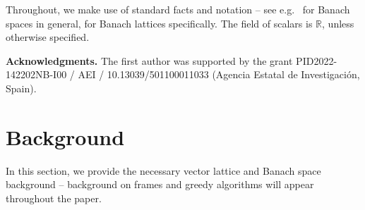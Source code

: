 \documentclass[12pt,leqno]{amsart}
\numberwithin{equation}{section}
\theoremstyle{definition}
\def\R{{\mathbb R}}
\begin{document}
Throughout, we make use of standard facts and notation -- see e.g.~\cite{AK16, LT1, LT2} for Banach spaces in general, \cite{MN} for Banach lattices specifically. The field of scalars is $\R$, unless otherwise specified.
\medskip

\textbf{Acknowledgments.} The first author was supported by the grant PID2022-142202NB-I00 / AEI / 10.13039/501100011033 (Agencia Estatal de Investigaci\'on, Spain).





\section{Background}\label{Section2}
In this section, we provide the necessary vector lattice and Banach space background -- background on frames and greedy algorithms will appear throughout the paper. 
\medskip
\end{document}
